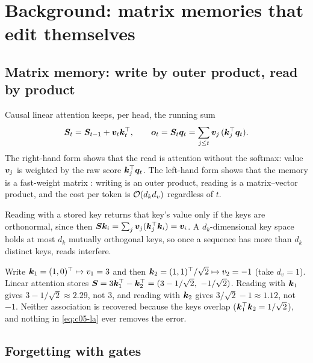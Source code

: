 \section{Background: matrix memories that edit themselves}\label{sec:c05-background}

\subsection{Matrix memory: write by outer product, read by product}\label{sec:c05-bg-matrix}

Causal linear attention \citep{katharopoulos2020transformers} keeps, per head, the running sum
\begin{equation}\label{eq:c05-la}
  \bm{S}_t = \bm{S}_{t-1} + \bm{v}_t\bm{k}_t^{\top}, \qquad \bm{o}_t = \bm{S}_t\bm{q}_t = \sum_{j\le t} \bm{v}_j\,(\bm{k}_j^{\top}\bm{q}_t).
\end{equation}
The right-hand form shows that the read is attention without the softmax: value $\bm{v}_j$ is weighted
by the raw score $\bm{k}_j^{\top}\bm{q}_t$. The left-hand form shows that the memory is a fast-weight matrix
\citep{schmidhuber1992fastweights,c02-schlag2021linear}: writing is an outer product, reading is a
matrix--vector product, and the cost per token is $\mathcal{O}(d_k d_v)$ regardless of $t$.

Reading with a stored key returns that key's value only if the keys are orthonormal, since then
$\bm{S}\bm{k}_i = \sum_j \bm{v}_j (\bm{k}_j^{\top}\bm{k}_i) = \bm{v}_i$. A $d_k$-dimensional key space holds at most $d_k$
mutually orthogonal keys, so once a sequence has more than $d_k$ distinct keys, reads interfere.

\begin{example}[Interference with $d_k = 2$]\label{ex:c05-interference}
Write $\bm{k}_1 = (1,0)^{\top} \mapsto v_1 = 3$ and then $\bm{k}_2 = (1,1)^{\top}/\sqrt2 \mapsto v_2 = -1$
(take $d_v = 1$). Linear attention stores $\bm{S} = 3\bm{k}_1^{\top} - \bm{k}_2^{\top} = (3 - 1/\sqrt2,\ -1/\sqrt2)$.
Reading with $\bm{k}_1$ gives $3 - 1/\sqrt2 \approx 2.29$, not $3$, and reading with $\bm{k}_2$ gives
$3/\sqrt2 - 1 \approx 1.12$, not $-1$. Neither association is recovered because the keys overlap
($\bm{k}_1^{\top}\bm{k}_2 = 1/\sqrt2$), and nothing in \cref{eq:c05-la} ever removes the error.
\end{example}

\subsection{Forgetting with gates}\label{sec:c05-bg-gates}

